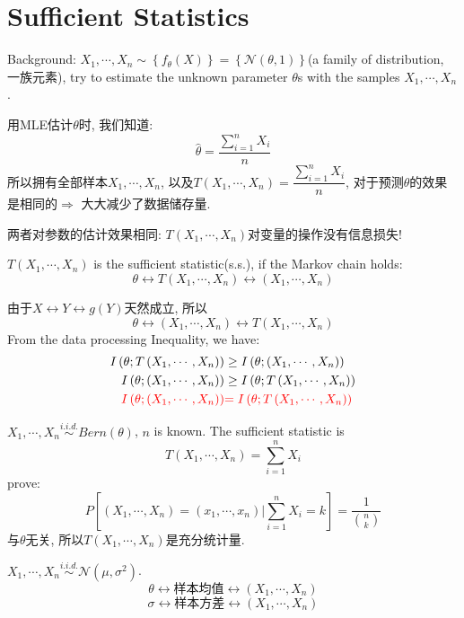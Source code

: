 \section{Sufficient Statistics}
Background: $X_1,\cdots,X_n\sim \left\{f_{\theta}(X)\right\}=\left\{\mathcal{N}(\theta,1)\right\}$(a family of distribution, 一族元素), try to estimate the unknown parameter $\theta$s with the samples $X_1,\cdots,X_n$.

用MLE估计$\theta$时, 我们知道:
$$\hat{\theta} = \dfrac{\sum\limits_{i=1}^n X_i}{n}$$
所以拥有全部样本$X_1,\cdots,X_n$, 以及$T(X_1,\cdots,X_n)=\dfrac{\sum\limits_{i=1}^n X_i}{n}$, 对于预测$\theta$的效果是相同的$\Rightarrow$ 大大减少了数据储存量.

两者对参数的估计效果相同: $T(X_1,\cdots,X_n)$对变量的操作没有信息损失!

\begin{definition}
$T(X_1,\cdots,X_n)$ is the sufficient statistic(s.s.), if the Markov chain holds:
$$\theta\leftrightarrow T\left(X_1,\cdots,X_n\right)\leftrightarrow \left(X_1,\cdots,X_n\right)$$
\end{definition}
由于$X\leftrightarrow Y\leftrightarrow g(Y)$天然成立, 所以$$\theta\leftrightarrow \left(X_1,\cdots,X_n\right) \leftrightarrow T\left(X_1,\cdots,X_n\right)$$
From the data processing Inequality, we have:
\begin{align*}
I\left(\theta;T\left(X_1,\cdots,X_n\right)\right) &\geq I\left(\theta;\left(X_1,\cdots,X_n\right)\right) \\
I\left(\theta;\left(X_1,\cdots,X_n\right)\right) &\geq I\left(\theta;T\left(X_1,\cdots,X_n\right)\right) \\
\textcolor{red}{I\left(\theta;\left(X_1,\cdots,X_n\right)\right)} &\textcolor{red}{= I\left(\theta;T\left(X_1,\cdots,X_n\right)\right)}
\end{align*}

\begin{example}
$X_1,\cdots,X_n \stackrel{i.i.d.}{\sim} Bern(\theta)$, $n$ is known.
The sufficient statistic is
$$T(X_1,\cdots,X_n)=\sum_{i=1}^n X_i$$
prove:
$$P\left[(X_1,\cdots,X_n)=(x_1,\cdots,x_n)\big|\sum_{i=1}^nX_i=k\right]=\dfrac{1}{\binom{n}{k}}$$
与$\theta$无关, 所以$T(X_1,\cdots,X_n)$是充分统计量.
\end{example}

\begin{example}
$X_1,\cdots,X_n \stackrel{i.i.d.}{\sim} \mathcal{N}(\mu,\sigma^2)$.
$$\theta\leftrightarrow \text{样本均值} \leftrightarrow \left(X_1,\cdots,X_n\right)$$
$$\sigma\leftrightarrow \text{样本方差} \leftrightarrow \left(X_1,\cdots,X_n\right)$$
\end{example}

